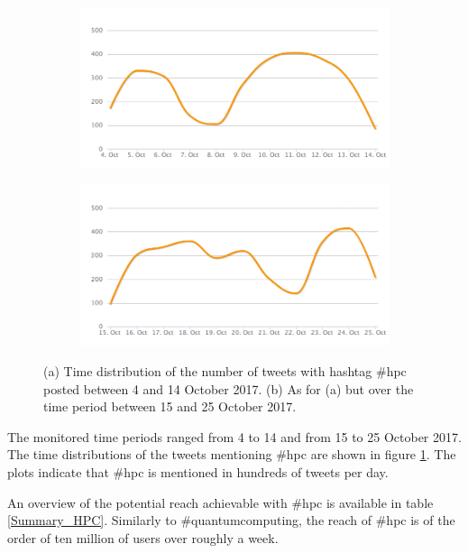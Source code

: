 \begin{figure}
 \centering
 \begin{subfigure}[b]{0.95\textwidth}
   \includegraphics[width=1\linewidth]{Images/FirstSearch_HPC.png}
   \caption{} 
 \end{subfigure}

 \begin{subfigure}[b]{0.95\textwidth}
   \includegraphics[width=1\linewidth]{Images/SecondSearch_HPC.png}
   \caption{}
 \end{subfigure}
 \caption{(a) Time distribution of the number of tweets with hashtag \#hpc posted between 4 and 14 October 2017. (b) As for (a) but over the time period between 15 and 25 October 2017.} 
 \label{First-SecondSearch_HPC}
\end{figure}

The monitored time periods ranged from 4 to 14 and from 15 to 25 October 2017. The time distributions of the tweets mentioning \#hpc are shown in figure \ref{First-SecondSearch_HPC}. The plots indicate that \#hpc is mentioned in hundreds of tweets per day.

An overview of the potential reach achievable with \#hpc is available in table \ref{Summary_HPC}. Similarly to \#quantumcomputing, the reach of \#hpc is of the order of ten million of users over roughly a week. 

